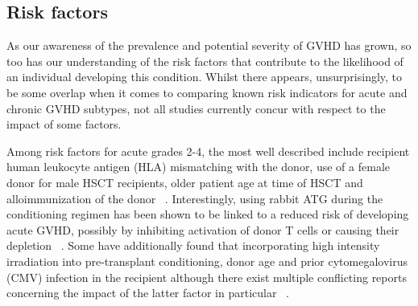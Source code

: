 \subsection{Risk factors}
As our awareness of the prevalence and potential severity of GVHD has grown, so too has our understanding of the risk factors that contribute to the likelihood of an individual developing this condition. Whilst there appears, unsurprisingly, to be some overlap when it comes to comparing known risk indicators for acute and chronic GVHD subtypes, not all studies currently concur with respect to the impact of some factors. 

Among risk factors for acute grades 2-4, the most well described include recipient human leukocyte antigen (HLA) mismatching with the donor, use of a female donor for male HSCT recipients, older patient age at time of HSCT and alloimmunization of the donor ~\autocite{Flo2011}. Interestingly, using rabbit ATG during the conditioning regimen has been shown to be linked to a reduced risk of developing acute GVHD, possibly by inhibiting activation of donor T cells or causing their depletion ~\autocite{Flo2011}. Some have additionally found that incorporating high intensity irradiation into pre-transplant conditioning, donor age and prior cytomegalovirus (CMV) infection in the recipient although there exist multiple conflicting reports concerning the impact of the latter factor in particular ~\autocite{Hah2008}.

